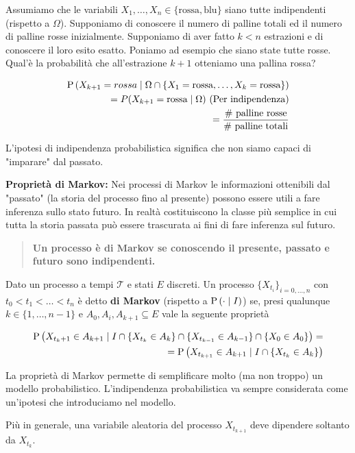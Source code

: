 \begin{exmp}
	Assumiamo che le variabili $ X_1, \hdots, X_n \in \{\text{rossa}, \text{blu}\} $ siano tutte indipendenti (rispetto a $ \Omega $). Supponiamo di conoscere il numero di palline totali ed il numero di palline rosse inizialmente. Supponiamo di aver fatto $ k < n $ estrazioni e di conoscere il loro esito esatto. Poniamo ad esempio che siano state tutte rosse. Qual'è la probabilità che all'estrazione $ k+1 $ otteniamo una pallina rossa?
	
	\begin{equation*}
	\begin{aligned}
	\text{P}\left(X_{k+1} = rossa \mid \Omega \cap \{X_1 = \text{rossa}, \hdots, X_k = \text{rossa} \} \right) \\
	= P(X_{k+1} = \text{rossa} \mid \Omega)	\text{  (Per indipendenza)} \\
	= \dfrac{\text{\# palline rosse}}{\text{\# palline totali}}
	\end{aligned}
	\end{equation*}
	
	L'ipotesi di indipendenza probabilistica significa che non siamo capaci di "imparare" dal passato.
	
\end{exmp}

\begin{defn}
	\textbf{Proprietà di Markov:}
	Nei processi di Markov le informazioni ottenibili dal "passato" (la storia del processo fino al presente) possono essere utili a fare inferenza sullo stato futuro. In realtà costituiscono la classe più semplice in cui tutta la storia passata può essere trascurata ai fini di fare inferenza sul futuro.
	
	\begin{quote}
		\textbf{Un processo è di Markov se conoscendo il presente, passato e futuro sono indipendenti.}
	\end{quote}

	Dato un processo a tempi $ \mathcal{T} $ e stati $ E $ discreti. Un processo  $ \{X_{t_i}\}_{i=0, \hdots, n} $ con $ t_0 < t_1 < \hdots < t_n$ è detto \textbf{di Markov} (rispetto a $ \text{P}\left(\cdot \mid I\right) $) se, presi qualunque $ k \in \{1, \hdots, n-1\} $ e $ A_0, A_i, A_{k+1} \subseteq E$ vale la seguente proprietà
	
	\begin{equation*}
		\begin{aligned}
		\text{P}\left(X_{t_k+1} \in A_{k+1} \mid I \cap \{X_{t_k} \in A_k\} \cap \{X_{t_{k-1}} \in A_{k-1}\} \cap \{X_0 \in A_0\}\right) = \\
		= \text{P}\left(X_{t_{k+1}} \in A_{k+1} \mid I \cap \{X_{t_k} \in A_k\}\right)
		\end{aligned}
	\end{equation*} 
	
	La proprietà di Markov permette di semplificare molto (ma non troppo) un modello probabilistico. L'indipendenza probabilistica va sempre considerata come un'ipotesi che introduciamo nel modello.
	
	Più in generale, una variabile aleatoria del processo $ X_{t_{k+1}} $ deve dipendere soltanto da $ X_{t_{k}} $. 
\end{defn}

